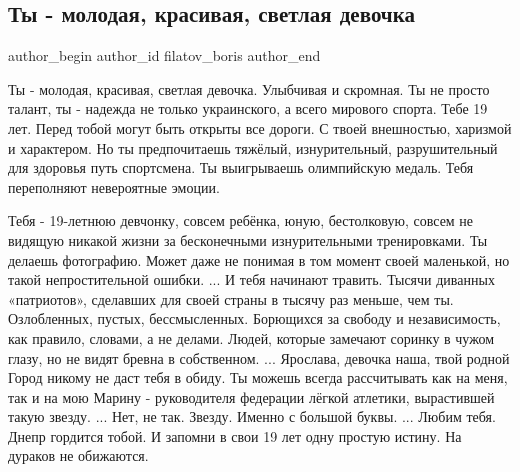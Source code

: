  
 
 
 
 
 
\subsection{Ты - молодая, красивая, светлая девочка}
\label{sec:09_08_2021.fb.filatov_boris.1.devochka_maguchih}
 
\ifcmt
 author_begin
   author_id filatov_boris
 author_end
\fi

\obeycr
Ты - молодая, красивая, светлая девочка.
Улыбчивая и скромная. 
Ты не просто талант, ты - надежда не только украинского, а всего мирового спорта.
Тебе 19 лет. 
Перед тобой могут быть открыты все дороги. 
С твоей внешностью, харизмой и характером.
Но ты предпочитаешь тяжёлый, изнурительный, разрушительный для здоровья путь спортсмена.
Ты выигрываешь олимпийскую медаль.
Тебя переполняют невероятные эмоции. 
\restorecr


\obeycr
Тебя - 19-летнюю девчонку, совсем ребёнка, юную, бестолковую, совсем не видящую
никакой жизни за бесконечными изнурительными тренировками. 
\smallskip
Ты делаешь фотографию. Может даже не понимая в том момент своей маленькой, но
такой непростительной ошибки.  ...
\smallskip
И тебя начинают травить.
Тысячи диванных «патриотов», сделавших для своей страны в тысячу раз меньше, чем ты.
Озлобленных, пустых, бессмысленных.
Борющихся за свободу и независимость, как правило, словами, а не делами.
Людей, которые замечают соринку в чужом глазу, но не видят бревна в собственном.  ...
\smallskip
Ярослава, девочка наша, твой родной Город никому не даст тебя в обиду.
\smallskip
Ты можешь всегда рассчитывать как на меня, так и на мою Марину - руководителя
федерации лёгкой атлетики, вырастившей такую звезду.
...
Нет, не так. 
Звезду.
Именно с большой буквы.
...
Любим тебя. Днепр гордится тобой.
И запомни в свои 19 лет одну простую истину.
На дураков не обижаются.
\restorecr


